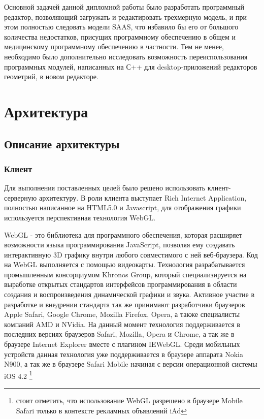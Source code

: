 \documentclass[12pt, a4paper]{article}
\let\stdsection\section
\renewcommand\section{\newpage\stdsection}
\begin{document}
Основной задачей данной дипломной работы было разработать программный редактор,
позволяющий загружать и редактировать трехмерную модель, и при этом полностью
следовать модели SAAS, что избавило бы его от большого количества недостатков,
присущих программному обеспечению в общем и медицинскому программному
обеспечению в частности. Тем не менее, необходимо было дополнительно исследовать
возможность переиспользования программных модулей, написанных на С++ для
desktop-приложений редакторов геометрий, в новом редакторе.

\section{Архитектура}
\subsection{Описание архитектуры}
\subsubsection{Клиент}
Для выполнения поставленных целей было решено использовать клиент-серверную
архитектуру. В роли клиента выступает Rich Internet Application, полностью
написанное на HTML5.0 и Javascript, для отображения графики используется
перспективная технология WebGL.

WebGL - это библиотека для программного обеспечения, которая расширяет
возможности языка программирования JavaScript, позволяя ему создавать
интерактивную 3D графику внутри любого совместимого с ней веб-браузера. Код на
WebGL выполняется с помощью видеокарты. Технология
разрабатывается промышленным консорциумом Khronos Group, который
специализируется на выработке открытых стандартов интерфейсов программирования в
области создания и воспроизведения динамической графики и звука. Активное
участие в разработке и внедрении стандарта так же принимают разработчики
браузеров Apple Safari, Google Chrome, Mozilla Firefox, Opera,  а также
специалисты компаний AMD и NVidia. На данный момент технология поддерживается в
последних версиях браузеров Safari, Mozilla, Opera и Chrome, а так же в браузере
Internet Explorer вместе с плагином IEWebGL. Среди мобильных устройств данная
технология уже поддерживается в браузере аппарата Nokia N900, а так же в
браузере Safari Mobile начиная с версии операционной системы iOS 4.2
\footnote{стоит отметить, что использование WebGL разрешено в браузере Mobile
Safari только в контексте рекламных объявлений iAd}
\end{document}
